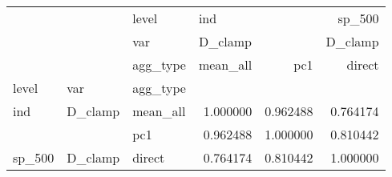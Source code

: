 \begin{tabular}{lllrrr}
\toprule
       &         & level & \multicolumn{2}{l}{ind} &    sp\_500 \\
       &         & var & \multicolumn{2}{l}{D\_clamp} &   D\_clamp \\
       &         & agg\_type &  mean\_all &       pc1 &    direct \\
level & var & agg\_type &           &           &           \\
\midrule
ind & D\_clamp & mean\_all &  1.000000 &  0.962488 &  0.764174 \\
       &         & pc1 &  0.962488 &  1.000000 &  0.810442 \\
sp\_500 & D\_clamp & direct &  0.764174 &  0.810442 &  1.000000 \\
\bottomrule
\end{tabular}
